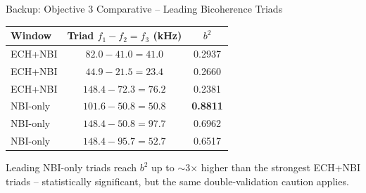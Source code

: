 \documentclass[aspectratio=169]{beamer}
\begin{document}
\begin{frame}{Backup: Objective 3 Comparative -- Leading Bicoherence Triads}
    \small
    \centering
    \begin{tabular}{lcc}
        \toprule
        Window & Triad $f_1 - f_2 = f_3$ (kHz) & $b^2$ \\
        \midrule
        ECH+NBI  & $82.0 - 41.0 = 41.0$   & 0.2937 \\
        ECH+NBI  & $44.9 - 21.5 = 23.4$   & 0.2660 \\
        ECH+NBI  & $148.4 - 72.3 = 76.2$  & 0.2381 \\
        \midrule
        NBI-only & $101.6 - 50.8 = 50.8$  & \textbf{0.8811} \\
        NBI-only & $148.4 - 50.8 = 97.7$  & 0.6962 \\
        NBI-only & $148.4 - 95.7 = 52.7$  & 0.6517 \\
        \bottomrule
    \end{tabular}
    \vspace{0.3cm}
    \normalsize
    Leading NBI-only triads reach $b^2$ up to $\sim$3$\times$ higher than the
    strongest ECH+NBI triads -- statistically significant, but the same
    double-validation caution applies.
\end{frame}
\end{document}
